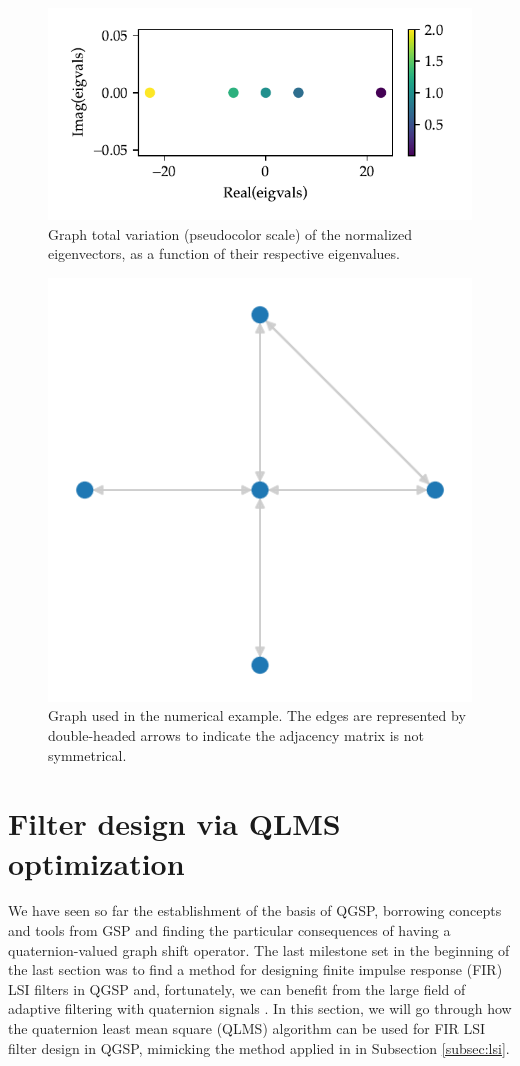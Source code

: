\begin{figure}
    \centering
    \includegraphics[width=0.55\linewidth]{Figures/simple_example_tv.pdf}
    \caption{Graph total variation (pseudocolor scale) of the normalized eigenvectors, as a function of their respective eigenvalues.}
    \label{fig:simple_example_tv}
\end{figure}

\begin{figure}
    \centering
    \includegraphics[width=0.3\linewidth]{Figures/degenerate_qgft_graph.pdf}
    \caption{Graph used in the numerical example. The edges are represented by double-headed arrows to indicate the adjacency matrix is not symmetrical.}
    \label{fig:degenerate_qgft_graph}
\end{figure}

\section{Filter design via QLMS optimization}
We have seen so far the establishment of the basis of QGSP, borrowing concepts and tools from GSP and finding the particular consequences of having a quaternion-valued graph shift operator. The last milestone set in the beginning of the last section was to find a method for designing finite impulse response (FIR) LSI filters in QGSP and, fortunately, we can benefit from the large field of adaptive filtering with quaternion signals \cite{ortolani2017frequency}. In this section, we will go through how the quaternion least mean square (QLMS) algorithm can be used for FIR LSI filter design in QGSP, mimicking the method applied in in Subsection \ref{subsec:lsi}.


